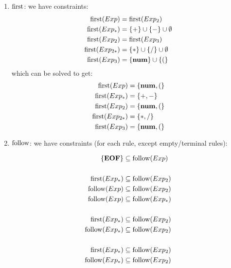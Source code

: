 \begin{exercise}{}
\begin{solution}
\begin{enumerate}
\begin{enumerate}
          \item \(\operatorname{first}\): we have constraints:
            \begin{align*}
              \operatorname{first}(Exp) &= \operatorname{first}(Exp_2) \\
              \operatorname{first}(Exp_*) &= \{+\} \cup \{-\} \cup \emptyset \\
              \operatorname{first}(Exp_2) &= \operatorname{first}(Exp_3) \\
              \operatorname{first}(Exp_{2*}) &= \{*\} \cup \{/\} \cup \emptyset \\
              \operatorname{first}(Exp_3) &= \{\mathbf{num}\} \cup \{(\}
            \end{align*}
            which can be solved to get:
            \begin{align*}
              \operatorname{first}(Exp) &= \{\mathbf{num}, (\} \\
              \operatorname{first}(Exp_*) &= \{+, -\} \\
              \operatorname{first}(Exp_2) &= \{\mathbf{num}, (\} \\
              \operatorname{first}(Exp_{2*}) &= \{*, /\} \\
              \operatorname{first}(Exp_3) &= \{\mathbf{num}, (\}
            \end{align*}
          \item \(\operatorname{follow}\): we have constraints (for each rule, except
          empty/terminal rules):
          \begin{multicols}{2}
            \allowdisplaybreaks
            \begin{align*}
              \{\mathbf{EOF}\} &\subseteq \follow(Exp) \\
              &\\
              \first(Exp_*) &\subseteq \follow(Exp_2) \\
              \follow(Exp) &\subseteq \follow(Exp_2) \\
              \follow(Exp) &\subseteq \follow(Exp_*) \\
              &\\
              \first(Exp_*) &\subseteq \follow(Exp_2) \\
              \follow(Exp_*) &\subseteq \follow(Exp_2) \\
              &\\
              \first(Exp_*) &\subseteq \follow(Exp_2) \\
              \follow(Exp_*) &\subseteq \follow(Exp_2) \\
              &\\

\end{align*}
\end{multicols}
\end{enumerate}
\end{enumerate}
\end{solution}
\end{exercise}
